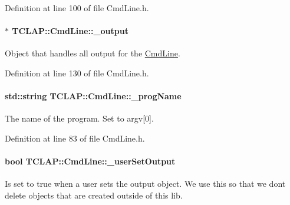 Definition at line 100 of file Cmd\+Line.\+h.

\paragraph[{\texorpdfstring{\+\_\+output}{_output}}]{$\ast$ T\+C\+L\+A\+P\+::\+Cmd\+Line\+::\+\_\+output\hspace{0.3cm}{\ttfamily [protected]}}\hypertarget{classTCLAP_1_1CmdLine_a5152bf4ef26217583a3bc708aa0ea83e}{}\label{classTCLAP_1_1CmdLine_a5152bf4ef26217583a3bc708aa0ea83e}
Object that handles all output for the \hyperlink{classTCLAP_1_1CmdLine}{Cmd\+Line}. 

Definition at line 130 of file Cmd\+Line.\+h.

\paragraph[{\texorpdfstring{\+\_\+prog\+Name}{_progName}}]{\setlength{\rightskip}{0pt plus 5cm}std\+::string T\+C\+L\+A\+P\+::\+Cmd\+Line\+::\+\_\+prog\+Name\hspace{0.3cm}{\ttfamily [protected]}}\hypertarget{classTCLAP_1_1CmdLine_a8b856dadc54fa30d0dddba4588ef9344}{}\label{classTCLAP_1_1CmdLine_a8b856dadc54fa30d0dddba4588ef9344}
The name of the program. Set to argv\mbox{[}0\mbox{]}. 

Definition at line 83 of file Cmd\+Line.\+h.

\paragraph[{\texorpdfstring{\+\_\+user\+Set\+Output}{_userSetOutput}}]{\setlength{\rightskip}{0pt plus 5cm}bool T\+C\+L\+A\+P\+::\+Cmd\+Line\+::\+\_\+user\+Set\+Output\hspace{0.3cm}{\ttfamily [private]}}\hypertarget{classTCLAP_1_1CmdLine_ab78aec340244f230a41dd946d0138aba}{}\label{classTCLAP_1_1CmdLine_ab78aec340244f230a41dd946d0138aba}
Is set to true when a user sets the output object. We use this so that we don\textquotesingle{}t delete objects that are created outside of this lib. 


